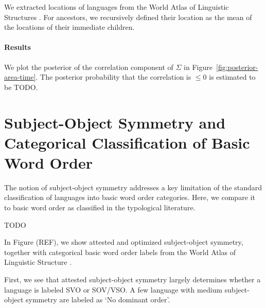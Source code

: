 \documentclass[11pt,a4paper]{article}
\begin{document}
We extracted locations of languages from the World Atlas of Linguistic Structures \citep{haspelmath2005the}.
For ancestors, we recursively defined their location as the mean of the locations of their immediate children.





\paragraph{Results}
We plot the posterior of the correlation component of $\Sigma$ in Figure~\ref{fig:posterior-area-time}.
The posterior probability that the correlation is $\leq 0$ is estimated to be TODO.







\section{Subject-Object Symmetry and Categorical Classification of Basic Word Order}

The notion of subject-object symmetry addresses a key limitation of the standard classification of languages into basic word order categories.
Here, we compare it to basic word order as classified in the typological literature.

TODO


In Figure (REF), we show attested and optimized subject-object symmetry, together with categorical basic word order labels from the World Atlas of Linguistic Structure \citep{wals-81}.

First, we see that attested subject-object symmetry largely determines whether a language is labeled SVO or SOV/VSO.
A few language with medium subject-object symmetry are labeled as `No dominant order'.
\end{document}
